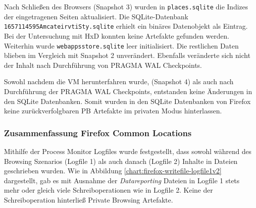 \begin{appendices}
		Nach Schließen des Browsers (Snapshot 3) wurden in \texttt{places.sqlite} die Indizes der eingetragenen Seiten aktualisiert. Die SQLite-Datenbank \texttt{1657114595AmcateirvtiSty.sqlite} erhielt ein binäres Datenobjekt als Eintrag. Bei der Untersuchung mit HxD konnten keine Artefakte gefunden werden. Weiterhin wurde \texttt{webappsstore.sqlite} leer initialisiert. Die restlichen Daten blieben im Vergleich mit Snapshot 2 unverändert. Ebenfalls veränderte sich nicht der Inhalt nach Durchführung von PRAGMA WAL Checkpoints.
		
		Sowohl nachdem die VM herunterfahren wurde, (Snapshot 4) als auch nach Durchführung der PRAGMA WAL Checkpoints, entstanden keine Änderungen in den SQLite Datenbanken.	
		Somit wurden in den SQLite Datenbanken von Firefox keine zurückverfolgbaren PB Artefakte im privaten Modus hinterlassen.
		
		\subsubsection*{Zusammenfassung Firefox Common Locations}
		Mithilfe der Process Monitor Logfiles wurde festgestellt, dass sowohl während des Browsing Szenarios (Logfile 1) als auch danach (Logfile 2) Inhalte in Dateien geschrieben wurden. Wie in Abbildung \ref{chart:firefox-writefile-logfile1v2} dargestellt, gab es mit Ausnahme der \textit{Datareporting} Dateien in Logfile 1 stets mehr oder gleich viele Schreiboperationen wie in Logfile 2. Keine der Schreiboperation hinterließ Private Browsing Artefakte.
		
		\begin{figure}[h!]
\end{figure}
\end{appendices}
